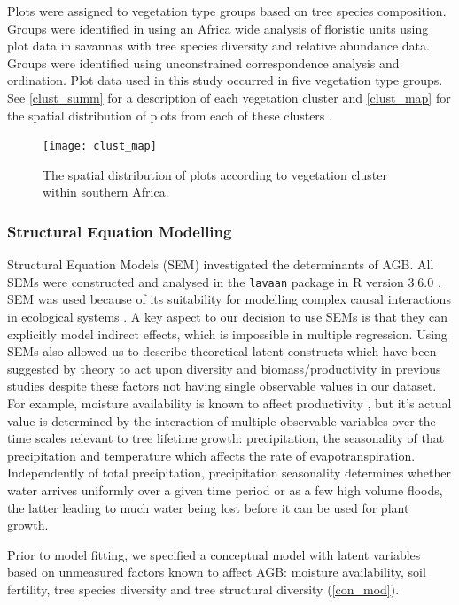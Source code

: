 \documentclass[11pt,a4paper]{article}
\begin{document}
Plots were assigned to vegetation type groups based on tree species composition. Groups were identified in \citet{Fayolle2018} using an Africa wide analysis of floristic units using plot data in savannas with tree species diversity and relative abundance data. Groups were identified using unconstrained correspondence analysis and ordination. Plot data used in this study occurred in five vegetation type groups. See \autoref{clust_summ} for a description of each vegetation cluster and \autoref{clust_map} for the spatial distribution of plots from each of these clusters .



\begin{figure}[H]
\centering
	\texttt{[image: clust\_map]}
	\caption{The spatial distribution of plots according to vegetation cluster within southern Africa.}
	\label{clust_map}
\end{figure}

\subsubsection{Structural Equation Modelling}

Structural Equation Models (SEM) investigated the determinants of AGB. All SEMs were constructed and analysed in the \verb|lavaan| package in R version 3.6.0 \citep{R2019}. SEM was used because of its suitability for modelling complex causal interactions in ecological systems \citep{Lee2007}. A key aspect to our decision to use SEMs is that they can explicitly model indirect effects, which is impossible in multiple regression. Using SEMs also allowed us to describe theoretical latent constructs which have been suggested by theory to act upon diversity and biomass/productivity in previous studies despite these factors not having single observable values in our dataset. For example, moisture availability is known to affect productivity \citep{}, but it's actual value is determined by the interaction of multiple observable variables over the time scales relevant to tree lifetime growth: precipitation, the seasonality of that precipitation and temperature which affects the rate of evapotranspiration. Independently of total precipitation, precipitation seasonality determines whether water arrives uniformly over a given time period or as a few high volume floods, the latter leading to much water being lost before it can be used for plant growth. 

Prior to model fitting, we specified a conceptual model with latent variables based on unmeasured factors known to affect AGB: moisture availability, soil fertility, tree species diversity and tree structural diversity (\autoref{con_mod}). 
\end{document}
